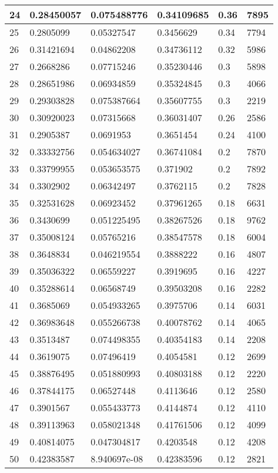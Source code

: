 \begin{longtable}{|l|l|l|l|l|l|}
24 & 0.28450057 & 0.075488776 & 0.34109685 & 0.36 & 7895 \\ \hline 
25 & 0.2805099 & 0.05327547 & 0.3456629 & 0.34 & 7794 \\ \hline 
26 & 0.31421694 & 0.04862208 & 0.34736112 & 0.32 & 5986 \\ \hline 
27 & 0.2668286 & 0.07715246 & 0.35230446 & 0.3 & 5898 \\ \hline 
28 & 0.28651986 & 0.06934859 & 0.35324845 & 0.3 & 4066 \\ \hline 
29 & 0.29303828 & 0.075387664 & 0.35607755 & 0.3 & 2219 \\ \hline 
30 & 0.30920023 & 0.07315668 & 0.36031407 & 0.26 & 2586 \\ \hline 
31 & 0.2905387 & 0.0691953 & 0.3651454 & 0.24 & 4100 \\ \hline 
32 & 0.33332756 & 0.054634027 & 0.36741084 & 0.2 & 7870 \\ \hline 
33 & 0.33799955 & 0.053653575 & 0.371902 & 0.2 & 7892 \\ \hline 
34 & 0.3302902 & 0.06342497 & 0.3762115 & 0.2 & 7828 \\ \hline 
35 & 0.32531628 & 0.06923452 & 0.37961265 & 0.18 & 6631 \\ \hline 
36 & 0.3430699 & 0.051225495 & 0.38267526 & 0.18 & 9762 \\ \hline 
37 & 0.35008124 & 0.05765216 & 0.38547578 & 0.18 & 6004 \\ \hline 
38 & 0.3648834 & 0.046219554 & 0.3888222 & 0.16 & 4807 \\ \hline 
39 & 0.35036322 & 0.06559227 & 0.3919695 & 0.16 & 4227 \\ \hline 
40 & 0.35288614 & 0.06568749 & 0.39503208 & 0.16 & 2282 \\ \hline 
41 & 0.3685069 & 0.054933265 & 0.3975706 & 0.14 & 6031 \\ \hline 
42 & 0.36983648 & 0.055266738 & 0.40078762 & 0.14 & 4065 \\ \hline 
43 & 0.3513487 & 0.074498355 & 0.40354183 & 0.14 & 2208 \\ \hline 
44 & 0.3619075 & 0.07496419 & 0.4054581 & 0.12 & 2699 \\ \hline 
45 & 0.38876495 & 0.051880993 & 0.40803188 & 0.12 & 2220 \\ \hline 
46 & 0.37844175 & 0.06527448 & 0.4113646 & 0.12 & 2580 \\ \hline 
47 & 0.3901567 & 0.055433773 & 0.4144874 & 0.12 & 4110 \\ \hline 
48 & 0.39113963 & 0.058021348 & 0.41761506 & 0.12 & 4099 \\ \hline 
49 & 0.40814075 & 0.047304817 & 0.4203548 & 0.12 & 4208 \\ \hline 
50 & 0.42383587 & 8.940697e-08 & 0.42383596 & 0.12 & 2821 \\ \hline 
\end{longtable}